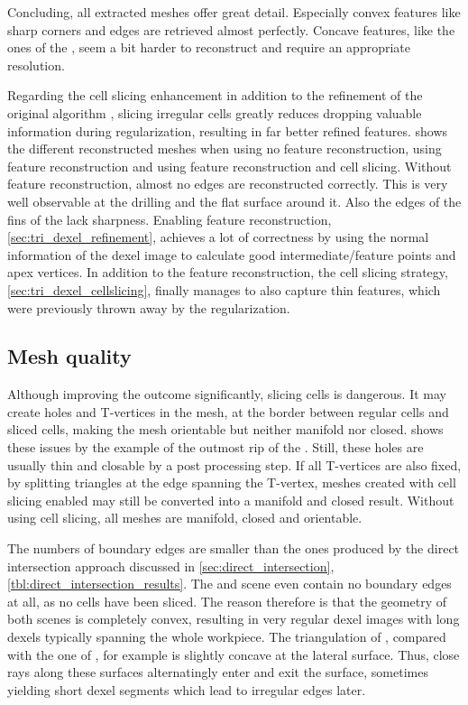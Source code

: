 Concluding, all extracted meshes offer great detail.
Especially convex features like sharp corners and edges are retrieved almost perfectly.
Concave features, like the ones of the \turbine, seem a bit harder to reconstruct and require an appropriate resolution.

Regarding the cell slicing enhancement in addition to the refinement of the original algorithm \cite{tridexel_reconstruction}, slicing irregular cells greatly reduces dropping valuable information during regularization, resulting in far better refined features.
 shows the different reconstructed meshes when using no feature reconstruction, using feature reconstruction and using feature reconstruction and cell slicing.
Without feature reconstruction, almost no edges are reconstructed correctly.
This is very well observable at the drilling and the flat surface around it.
Also the edges of the fins of the \cylinderhead lack sharpness.
Enabling feature reconstruction, \cf \cref{sec:tri_dexel_refinement}, achieves a lot of correctness by using the normal information of the dexel image to calculate good intermediate/feature points and apex vertices.
In addition to the feature reconstruction, the cell slicing strategy, \cf \cref{sec:tri_dexel_cellslicing}, finally manages to also capture thin features, which were previously thrown away by the regularization.


\subsection{Mesh quality}

Although improving the outcome significantly, slicing cells is dangerous.
It may create holes and T-vertices in the mesh, at the border between regular cells and sliced cells, making the mesh orientable but neither manifold nor closed.
 shows these issues by the example of the outmost rip of the \cylinderhead.
Still, these holes are usually thin and closable by a post processing step.
If all T-vertices are also fixed, \eg by splitting triangles at the edge spanning the T-vertex, meshes created with cell slicing enabled may still be converted into a manifold and closed result.
Without using cell slicing, all meshes are manifold, closed and orientable.

The numbers of boundary edges are smaller than the ones produced by the direct intersection approach discussed in \cref{sec:direct_intersection}, \cf \cref{tbl:direct_intersection_results}.
The \cubes and \cylinders scene even contain no boundary edges at all, as no cells have been sliced.
The reason therefore is that the geometry of both scenes is completely convex, resulting in very regular dexel images with long dexels typically spanning the whole workpiece.
The triangulation of \cylindersd, compared with the one of \cylinders, for example is slightly concave at the lateral surface.
Thus, close rays along these surfaces alternatingly enter and exit the surface, sometimes yielding short dexel segments which lead to irregular edges later.

